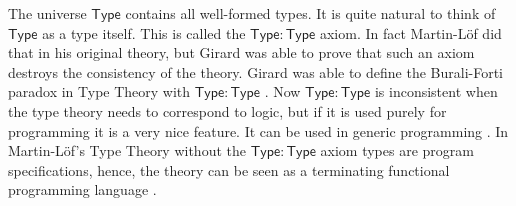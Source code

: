 The universe $\mathsf{Type}$ contains all well-formed types.  It is
quite natural to think of $\mathsf{Type}$ as a type itself.  This is
called the $\mathsf{Type}:\mathsf{Type}$ axiom.  In fact Martin-L\"of
did that in his original theory, but Girard was able to prove that
such an axiom destroys the consistency of the theory.  Girard was able
to define the Burali-Forti paradox in Type Theory with
$\mathsf{Type}:\mathsf{Type}$ \cite{Coquand:1986,Coquand:1994}.  Now
$\mathsf{Type}:\mathsf{Type}$ is inconsistent when the type theory
needs to correspond to logic, but if it is used purely for programming
it is a very nice feature.  It can be used in generic programming
\cite{Cardelli-1986}.  In Martin-L\"of's Type Theory without the
$\mathsf{Type}:\mathsf{Type}$ axiom types are program specifications,
hence, the theory can be seen as a terminating functional programming
language \cite{Nordstrom:1990}.
